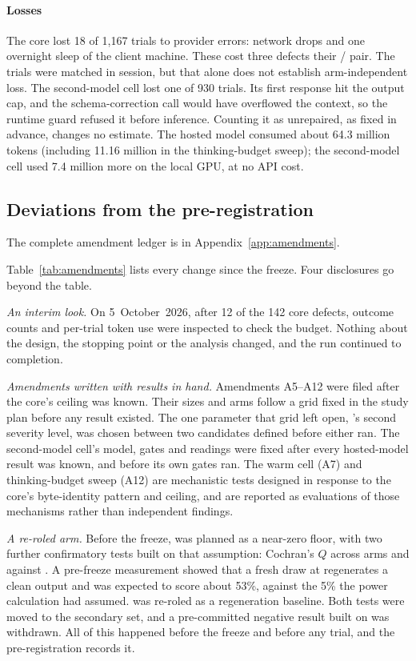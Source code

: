 \paragraph{Losses}
The core lost 18 of 1{,}167 trials to provider errors: network drops and one
overnight sleep of the client machine. These cost three defects their
/ pair. The trials were matched in session, but that alone does not establish arm-independent loss. The second-model cell lost one of 930 trials. Its
first response hit the output cap, and the schema-correction call would have
overflowed the context, so the runtime guard refused it before inference.
Counting it as unrepaired, as fixed in advance, changes no estimate. The hosted
model consumed about 64.3 million tokens (including 11.16 million in the
thinking-budget sweep); the second-model cell used 7.4 million more on the
local GPU, at no API cost.

\subsection{Deviations from the pre-registration}
\label{sec:design-deviations}

The complete amendment ledger is in Appendix~\ref{app:amendments}.

Table~\ref{tab:amendments} lists every change since the freeze. Four
disclosures go beyond the table.

\emph{An interim look.} On 5~October~2026, after 12 of the 142 core defects,
outcome counts and per-trial token use were inspected to check the budget.
Nothing about the design, the stopping point or the analysis changed, and the
run continued to completion.

\emph{Amendments written with results in hand.} Amendments A5--A12 were filed
after the core's ceiling was known. Their sizes and arms follow a grid fixed in
the study plan before any result existed. The one parameter that grid left
open, 's second severity level, was chosen between two candidates
defined before either ran. The second-model cell's model, gates and readings
were fixed after every hosted-model result was known, and before its own gates
ran. The warm cell (A7) and thinking-budget sweep (A12) are mechanistic
tests designed in response to the core's byte-identity pattern and ceiling,
and are reported as evaluations of those mechanisms rather than independent findings.

\emph{A re-roled arm.} Before the freeze,  was planned as a near-zero
floor, with two further confirmatory tests built on that assumption: Cochran's
$Q$ across arms and  against . A pre-freeze measurement showed
that a fresh draw at  regenerates a clean output and was expected to
score about 53\%, against the 5\% the power calculation had assumed. 
was re-roled as a regeneration baseline. Both tests were moved to the secondary
set, and a pre-committed negative result built on  was withdrawn. All
of this happened before the freeze and before any trial, and the
pre-registration records it.

